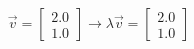 \documentclass[preview]{standalone}
\begin{document}
\begin{align*}
\vec{v} = \begin{bmatrix} 2.0 \\ 1.0 \end{bmatrix}\rightarrow \lambda \vec{v} = \begin{bmatrix} 2.0 \\ 1.0 \end{bmatrix}
\end{align*}
\end{document}
